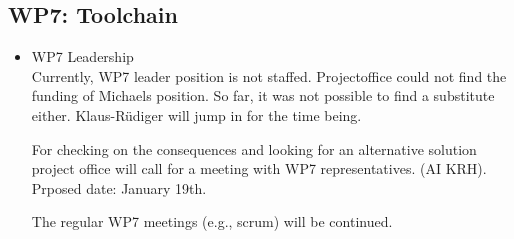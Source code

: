 \documentclass[a4paper, 11pt]{article}
\begin{document}
\subsection{WP7: Toolchain}

\begin{itemize}
\item WP7 Leadership\\
Currently, WP7 leader position is not staffed. Projectoffice could not find the funding of Michaels position. So far, it was not possible to find a substitute either. Klaus-R\"udiger will jump in for the time being. 

For  checking on the consequences and looking for an alternative solution project office will call for a meeting with WP7 representatives. (AI KRH). Prposed date: January 19th.

The regular WP7 meetings (e.g., scrum) will be continued.

\end{itemize}
\end{document}
